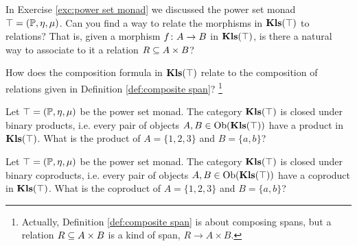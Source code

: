 \documentclass[CT4S-EN-RU]{subfiles}
\begin{document}
\begin{exampleRUS}\label{ex:experimenter matters 3}
\end{exampleRUS}

\begin{exerciseENG}\label{exc:kleisli powerset relations}
In Exercise \ref{exc:power set monad} we discussed the power set monad $\top=(\PP,\eta,\mu)$.
\sexc Can you find a way to relate the morphisms in $\Kls(\top)$ to relations? That is, given a morphism $f\taking A\to B$ in $\Kls(\top)$, is there a natural way to associate to it a relation $R\ss A\times B$?
\item How does the composition formula in $\Kls(\top)$ relate to the composition of relations given in Definition \ref{def:composite span}?
\footnote{Actually, Definition \ref{def:composite span} is about composing spans, but a relation $R\ss A\times B$ is a kind of span, $R\to A\times B$.}
\endsexc
\end{exerciseENG}

\begin{exerciseRUS}\label{exc:kleisli powerset relations}
\end{exerciseRUS}

\begin{exerciseENG}
Let $\top=(\PP,\eta,\mu)$ be the power set monad. The category $\Kls(\top)$ is closed under binary products, i.e. every pair of objects $A,B\in\Ob(\Kls(\top))$ have a product in $\Kls(\top)$. What is the product of $A=\{1,2,3\}$ and $B=\{a,b\}$?
\end{exerciseENG}

\begin{exerciseRUS}
\end{exerciseRUS}

\begin{exerciseENG}
Let $\top=(\PP,\eta,\mu)$ be the power set monad. The category $\Kls(\top)$ is closed under binary coproducts, i.e. every pair of objects $A,B\in\Ob(\Kls(\top))$ have a coproduct in $\Kls(\top)$. What is the coproduct of $A=\{1,2,3\}$ and $B=\{a,b\}$?
\end{exerciseENG}

\begin{exerciseRUS}
\end{exerciseRUS}
\end{document}

